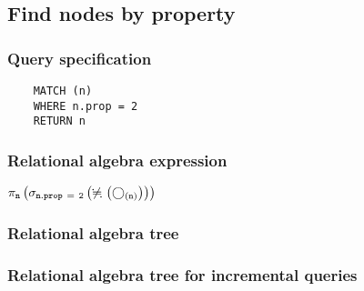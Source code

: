 	\subsection{Find nodes by property}

	\subsubsection*{Query specification}

	\begin{lstlisting}
	MATCH (n)
	WHERE n.prop = 2
	RETURN n
	\end{lstlisting}


	\subsubsection*{Relational algebra expression}

	$\projection{\var{n}} \left(\selection{\mathtt{n.prop~=~2}} \left(\alldifferent{} \left(\getvertices{n}{}\right)\right)\right)$

	\subsubsection*{Relational algebra tree}


	\subsubsection*{Relational algebra tree for incremental queries}

